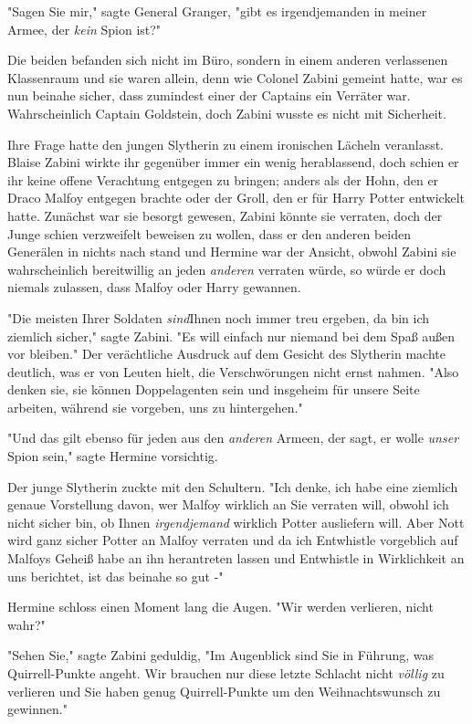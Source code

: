 {"Sagen Sie mir," sagte General Granger, "gibt es irgendjemanden in meiner Armee, der \emph{kein} Spion ist?"

Die beiden befanden sich nicht im Büro, sondern in einem anderen verlassenen Klassenraum und sie waren allein, denn wie Colonel Zabini gemeint hatte, war es nun beinahe sicher, dass zumindest einer der Captains ein Verräter war. Wahrscheinlich Captain Goldstein, doch Zabini wusste es nicht mit Sicherheit.

Ihre Frage hatte den jungen Slytherin zu einem ironischen Lächeln veranlasst. Blaise Zabini wirkte ihr gegenüber immer ein wenig herablassend, doch schien er ihr keine offene Verachtung entgegen zu bringen; anders als der Hohn, den er Draco Malfoy entgegen brachte oder der Groll, den er für Harry Potter entwickelt hatte. Zunächst war sie besorgt gewesen, Zabini könnte sie verraten, doch der Junge schien verzweifelt beweisen zu wollen, dass er den anderen beiden Generälen in nichts nach stand und Hermine war der Ansicht, obwohl Zabini sie wahrscheinlich bereitwillig an jeden \emph{anderen} verraten würde, so würde er doch niemals zulassen, dass Malfoy oder Harry gewannen.

"Die meisten Ihrer Soldaten \emph{sind}Ihnen noch immer treu ergeben, da bin ich ziemlich sicher," sagte Zabini. "Es will einfach nur niemand bei dem Spaß außen vor bleiben." Der verächtliche Ausdruck auf dem Gesicht des Slytherin machte deutlich, was er von Leuten hielt, die Verschwörungen nicht ernst nahmen. "Also denken sie, sie können Doppelagenten sein und insgeheim für unsere Seite arbeiten, während sie vorgeben, uns zu hintergehen."

"Und das gilt ebenso für jeden aus den \emph{anderen} Armeen, der sagt, er wolle \emph{unser} Spion sein," sagte Hermine vorsichtig.

Der junge Slytherin zuckte mit den Schultern. "Ich denke, ich habe eine ziemlich genaue Vorstellung davon, wer Malfoy wirklich an Sie verraten will, obwohl ich nicht sicher bin, ob Ihnen \emph{irgendjemand} wirklich Potter ausliefern will. Aber Nott wird ganz sicher Potter an Malfoy verraten und da ich Entwhistle vorgeblich auf Malfoys Geheiß habe an ihn herantreten lassen und Entwhistle in Wirklichkeit an uns berichtet, ist das beinahe so gut -"

Hermine schloss einen Moment lang die Augen. "Wir werden verlieren, nicht wahr?"

"Sehen Sie," sagte Zabini geduldig, "Im Augenblick sind Sie in Führung, was Quirrell-Punkte angeht. Wir brauchen nur diese letzte Schlacht nicht \emph{völlig} zu verlieren und Sie haben genug Quirrell-Punkte um den Weihnachtswunsch zu gewinnen."

}
